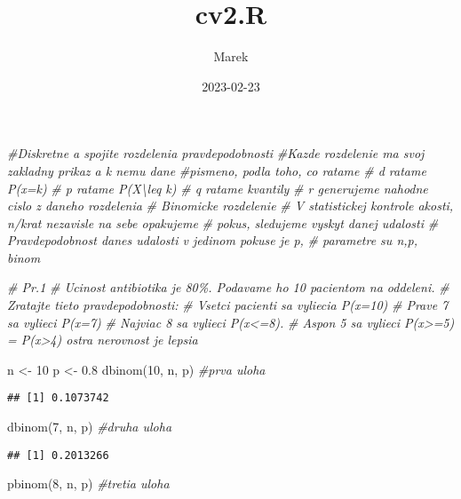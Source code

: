 \documentclass[
]{article}
\title{cv2.R}
\author{Marek}
\date{2023-02-23}
\newenvironment{Shaded}{\begin{snugshade}}{\end{snugshade}}
\newcommand{\CommentTok}[1]{\textcolor[rgb]{0.56,0.35,0.01}{\textit{#1}}}
\newcommand{\DecValTok}[1]{\textcolor[rgb]{0.00,0.00,0.81}{#1}}
\newcommand{\FloatTok}[1]{\textcolor[rgb]{0.00,0.00,0.81}{#1}}
\newcommand{\FunctionTok}[1]{\textcolor[rgb]{0.00,0.00,0.00}{#1}}
\newcommand{\NormalTok}[1]{#1}
\newcommand{\OtherTok}[1]{\textcolor[rgb]{0.56,0.35,0.01}{#1}}
\begin{document}
\maketitle

\begin{Shaded}
\begin{Highlighting}[]
\CommentTok{\#Diskretne a spojite rozdelenia pravdepodobnosti}
\CommentTok{\#Kazde rozdelenie ma svoj zakladny prikaz a k nemu dane}
\CommentTok{\#pismeno, podla toho, co ratame}
\CommentTok{\# d ratame P(x=k)}
\CommentTok{\# p ratame P(X\textbackslash{}leq k)}
\CommentTok{\# q ratame kvantily}
\CommentTok{\# r generujeme nahodne cislo z daneho rozdelenia}
\CommentTok{\# Binomicke rozdelenie}
\CommentTok{\# V statistickej kontrole akosti, n/krat nezavisle na sebe opakujeme}
\CommentTok{\# pokus, sledujeme vyskyt danej udalosti}
\CommentTok{\# Pravdepodobnost danes udalosti v jedinom pokuse je p,}
\CommentTok{\# parametre su n,p, binom}

\CommentTok{\# Pr.1}
\CommentTok{\# Ucinost antibiotika je  80\%. Podavame ho 10 pacientom na oddeleni.}
\CommentTok{\# Zratajte tieto pravdepodobnosti:}
\CommentTok{\# Vsetci pacienti sa vyliecia P(x=10)}
\CommentTok{\# Prave 7 sa vylieci P(x=7)}
\CommentTok{\# Najviac 8 sa vylieci P(x\textless{}=8).}
\CommentTok{\# Aspon 5 sa vylieci P(x\textgreater{}=5) = P(x\textgreater{}4)  ostra nerovnost je lepsia}

\NormalTok{n }\OtherTok{\textless{}{-}} \DecValTok{10}
\NormalTok{p }\OtherTok{\textless{}{-}} \FloatTok{0.8}
\FunctionTok{dbinom}\NormalTok{(}\DecValTok{10}\NormalTok{, n, p) }\CommentTok{\#prva uloha}
\end{Highlighting}
\end{Shaded}

\begin{verbatim}
## [1] 0.1073742
\end{verbatim}

\begin{Shaded}
\begin{Highlighting}[]
\FunctionTok{dbinom}\NormalTok{(}\DecValTok{7}\NormalTok{, n, p) }\CommentTok{\#druha uloha}
\end{Highlighting}
\end{Shaded}

\begin{verbatim}
## [1] 0.2013266
\end{verbatim}

\begin{Shaded}
\begin{Highlighting}[]
\FunctionTok{pbinom}\NormalTok{(}\DecValTok{8}\NormalTok{, n, p) }\CommentTok{\#tretia uloha}
\end{Highlighting}
\end{Shaded}
\end{document}
